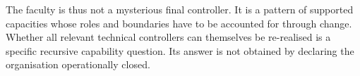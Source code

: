 The faculty is thus not a mysterious final controller. It is a pattern of supported capacities whose roles and boundaries have to be accounted for through change. Whether all relevant technical controllers can themselves be re-realised is a specific recursive capability question. Its answer is not obtained by declaring the organisation operationally closed.
